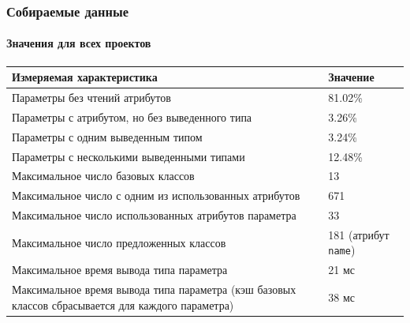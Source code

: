 \documentclass[handout]{beamer}
\begin{document}
\begin{frame}
  \frametitle{Собираемые данные}
  \framesubtitle{Значения для всех проектов}

  \begin{table}[H]
    \scriptsize

    \begin{tabularx}{\textwidth}{ |X|X| }
      \hline

      \bfseries Измеряемая характеристика & \bfseries Значение

      \\ \hline
      Параметры без чтений атрибутов & 81.02\%
      \\ \hline
      Параметры с атрибутом, но без выведенного типа & 3.26\%
      \\ \hline
      Параметры с одним выведенным типом & 3.24\% 
      \\ \hline
      Параметры с несколькими выведенными типами & 12.48\%
      \\ \hline

      Максимальное число базовых классов & 13
      \\ \hline
      Максимальное число с одним из использованных атрибутов & 671 
      \\ \hline
      Максимальное число использованных атрибутов параметра & 33 
      \\ \hline
      Максимальное число предложенных классов & 181 (атрибут \texttt{name}) 
      \\ \hline

      Максимальное время вывода типа параметра & 21 мс
      \\ \hline

      Максимальное время вывода типа параметра (кэш базовых классов сбрасывается
      для каждого параметра) & 38 мс
      \\ \hline

    \end{tabularx}
  \end{table}
\end{frame}
\end{document}
